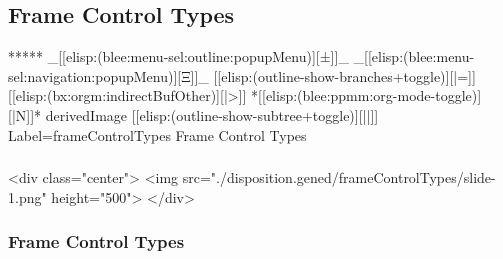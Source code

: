 \begin{whenOrg}
\section{Frame Control Types}


\begin{whenOrg}
*****  _[[elisp:(blee:menu-sel:outline:popupMenu)][±]]_ _[[elisp:(blee:menu-sel:navigation:popupMenu)][Ξ]]_ [[elisp:(outline-show-branches+toggle)][|=]] [[elisp:(bx:orgm:indirectBufOther)][|>]] *[[elisp:(blee:ppmm:org-mode-toggle)][|N]]*  derivedImage [[elisp:(outline-show-subtree+toggle)][||]] Label=frameControlTypes Frame Control Types
\end{whenOrg}

\begin{htmlonly}

\begin{frame}[fragile,plain,label=frameControlTypes]
    \frametitle{}
    \framesubtitle{}
    \begin{rawhtml}
<div class="center">
<img src="./disposition.gened/frameControlTypes/slide-1.png" height="500">
</div>
    \end{rawhtml}
\end{frame}
\end{htmlonly}

\begin{verblatex}

\begin{frame}[fragile,label=frameControlTypes]
    \frametitle{Frame Control Types}
    \framesubtitle{}


\end{frame}
\end{verblatex}
\end{whenOrg}
